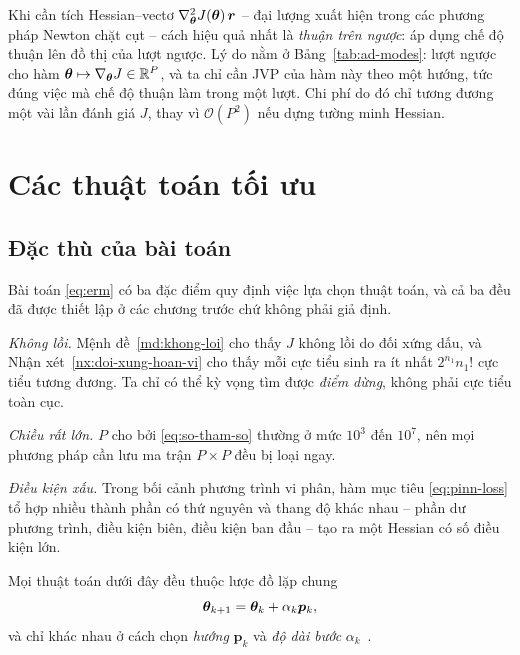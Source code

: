 \begin{nhanxet}
Khi cần tích Hessian--vectơ $\nabla^2_{\bm{\theta}} J(\bm{\theta})\,\bm{r}$ -- đại lượng
xuất hiện trong các phương pháp Newton chặt cụt -- cách hiệu quả nhất là
\emph{thuận trên ngược}: áp dụng chế độ thuận lên đồ thị của lượt ngược. Lý do
nằm ở Bảng~\ref{tab:ad-modes}: lượt ngược cho hàm
$\bm{\theta} \mapsto \nabla_{\bm{\theta}}J \in \mathbb{R}^P$, và ta chỉ cần JVP của hàm này theo
một hướng, tức đúng việc mà chế độ thuận làm trong một lượt. Chi phí do đó chỉ
tương đương một vài lần đánh giá $J$, thay vì $\mathcal{O}(P^2)$ nếu dựng tường
minh Hessian.
\end{nhanxet}
 
\section{Các thuật toán tối ưu}
\label{sec:optimizers}
 
\subsection{Đặc thù của bài toán}
\label{subsec:dac-thu}
 
Bài toán \eqref{eq:erm} có ba đặc điểm quy định việc lựa chọn thuật toán, và cả
ba đều đã được thiết lập ở các chương trước chứ không phải giả định.
 
\emph{Không lồi.} Mệnh đề~\ref{md:khong-loi} cho thấy $J$ không lồi do đối xứng
dấu, và Nhận xét~\ref{nx:doi-xung-hoan-vi} cho thấy mỗi cực tiểu sinh ra ít nhất
$2^{n_1}n_1!$ cực tiểu tương đương. Ta chỉ có thể kỳ vọng tìm được \emph{điểm
dừng}, không phải cực tiểu toàn cục.
 
\emph{Chiều rất lớn.} $P$ cho bởi \eqref{eq:so-tham-so} thường ở mức $10^3$ đến
$10^7$, nên mọi phương pháp cần lưu ma trận $P\times P$ đều bị loại ngay.
 
\emph{Điều kiện xấu.} Trong bối cảnh phương trình vi phân, hàm mục tiêu
\eqref{eq:pinn-loss} tổ hợp nhiều thành phần có thứ nguyên và thang độ khác nhau
-- phần dư phương trình, điều kiện biên, điều kiện ban đầu -- tạo ra một Hessian
có số điều kiện lớn.
 
Mọi thuật toán dưới đây đều thuộc lược đồ lặp chung
\begin{equation}
\bm{\theta}_{k+1} = \bm{\theta}_k + \alpha_k \bm{p}_k,
\label{eq:iter-scheme}
\end{equation}
và chỉ khác nhau ở cách chọn \emph{hướng} $\bm{p}_k$ và \emph{độ dài bước}
$\alpha_k$~\cite{nocedal2006}.
 

